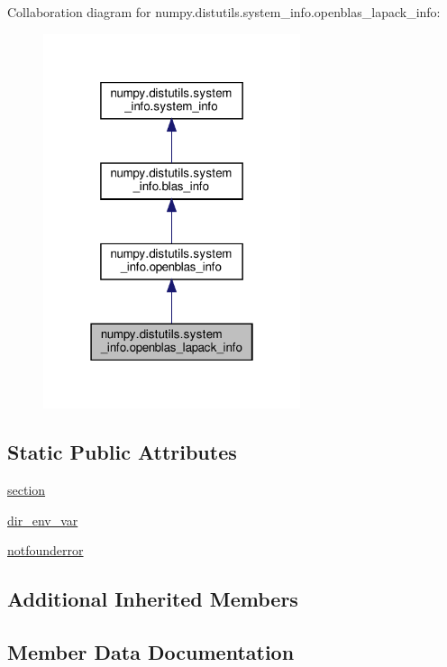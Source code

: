 Collaboration diagram for numpy.\+distutils.\+system\+\_\+info.\+openblas\+\_\+lapack\+\_\+info\+:
\nopagebreak
\begin{figure}[H]
\begin{center}
\leavevmode
\includegraphics[width=214pt]{classnumpy_1_1distutils_1_1system__info_1_1openblas__lapack__info__coll__graph}
\end{center}
\end{figure}
\subsection*{Static Public Attributes}
\begin{DoxyCompactItemize}
\item 
\hyperlink{classnumpy_1_1distutils_1_1system__info_1_1openblas__lapack__info_ac238ca2f5b9d48dbee5bfd15c82aa3c5}{section}
\item 
\hyperlink{classnumpy_1_1distutils_1_1system__info_1_1openblas__lapack__info_a558158f960e54c5f013752ec61eb1921}{dir\+\_\+env\+\_\+var}
\item 
\hyperlink{classnumpy_1_1distutils_1_1system__info_1_1openblas__lapack__info_a19b835dd5ba88f2e7ee70be8e733a9dc}{notfounderror}
\end{DoxyCompactItemize}
\subsection*{Additional Inherited Members}


\subsection{Member Data Documentation}
\mbox{\label{classnumpy_1_1distutils_1_1system__info_1_1openblas__lapack__info_a558158f960e54c5f013752ec61eb1921}} 
